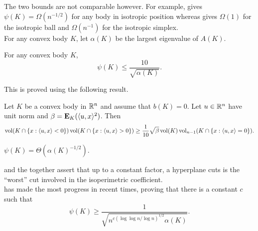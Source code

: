 The two bounds  are not comparable however. For example,  gives $\psi(K)=\Omega(n^{-1/2})$ for any body in isotropic position whereas  gives $\Omega(1)$ for the isotropic ball and $\Omega(n^{-1})$ for the isotropic simplex.\\

For any convex body $K$, let $\alpha(K)$ be the largest eigenvalue of $A(K)$. 

\begin{theorem}
	\label{kls conj hyperplane}
	For any convex body $K$,
	\[ \psi(K) \leq \frac{10}{\sqrt{\alpha(K)}}. \]
\end{theorem}

This is proved using the following result.

\begin{theorem}
	Let $K$ be a convex body in $\mathbb{R}^n$ and assume that $b(K)=0$. Let $u\in\mathbb{R}^n$ have unit norm and $\beta=\textbf{E}_K(\langle u,x\rangle^2)$. Then
	\[ \operatorname{vol}(K \cap \{x : \langle u,x\rangle < 0\}) \operatorname{vol}(K \cap \{x : \langle u,x\rangle > 0\}) \geq \frac{1}{10}\sqrt{\beta}\operatorname{vol}(K)\operatorname{vol}_{n-1}(K \cap \{x : \langle u,x\rangle = 0\}). \]
\end{theorem}

\begin{fcon}
	\label{con: kls conjecture}
	$\psi(K) = \Theta(\alpha(K)^{-1/2})$.
\end{fcon}

 and the  together assert that up to a constant factor, a hyperplane cuts is the ``worst'' cut involved in the isoperimetric coefficient.\\

\cite{chen2021constant} has made the most progress in recent times, proving that there is a constant $c$ such that
\[ \psi(K) \geq \frac{1}{\sqrt{ n^{c\left(\log\log n/\log n\right)^{1/2}} \alpha(K)}}. \]